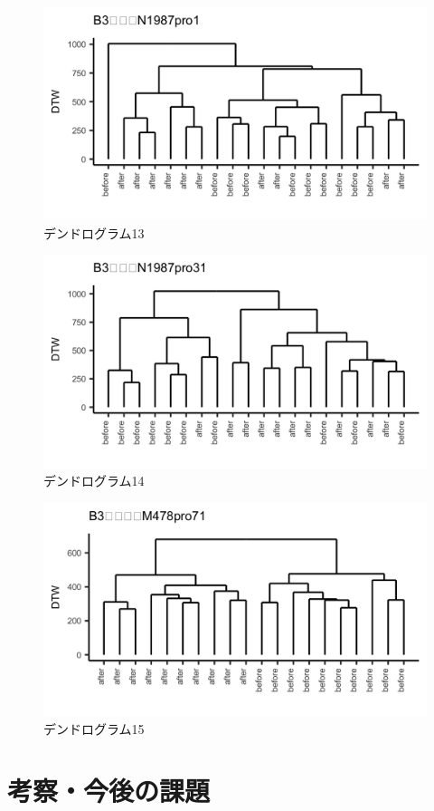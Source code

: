 \documentclass{jarticle}
\begin{document}
\begin{figure}[H]
	\begin{center}
		\includegraphics[width=15cm]{fig/dendro_13.png}
		\caption{デンドログラム13}
		\label{fig:dendro13}
	\end{center}
\end{figure}
\begin{figure}[H]
	\begin{center}
		\includegraphics[width=15cm]{fig/dendro_14.png}
		\caption{デンドログラム14}
		\label{fig:dendro14}
	\end{center}
\end{figure}
\begin{figure}[H]
	\begin{center}
		\includegraphics[width=15cm]{fig/dendro_15.png}
		\caption{デンドログラム15}
		\label{fig:dendro15}

	\end{center}
\end{figure}



\section{考察・今後の課題}






\end{document}
